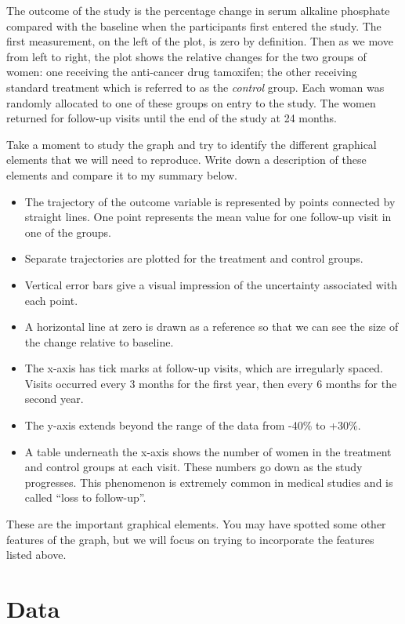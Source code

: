 \documentclass[
]{book}
\providecommand{\tightlist}{%
  \setlength{\itemsep}{0pt}\setlength{\parskip}{0pt}}
\begin{document}
The outcome of the study is the percentage change in serum alkaline phosphate compared with the baseline when the participants first entered the study. The first measurement, on the left of the plot, is zero by definition. Then as we move from left to right, the plot shows the relative changes for the two groups of women: one receiving the anti-cancer drug tamoxifen; the other receiving standard treatment which is referred to as the \emph{control} group. Each woman was randomly allocated to one of these groups on entry to the study. The women returned for follow-up visits until the end of the study at 24 months.

Take a moment to study the graph and try to identify the different graphical elements that we will need to reproduce. Write down a description of these elements and compare it to my summary below.

\begin{itemize}
\tightlist
\item
  The trajectory of the outcome variable is represented by points connected by straight lines. One point represents the mean value for one follow-up visit in one of the groups.
\item
  Separate trajectories are plotted for the treatment and control groups.
\item
  Vertical error bars give a visual impression of the uncertainty associated with each point.
\item
  A horizontal line at zero is drawn as a reference so that we can see the size of the change relative to baseline.
\item
  The x-axis has tick marks at follow-up visits, which are irregularly spaced. Visits occurred every 3 months for the first year, then every 6 months for the second year.
\item
  The y-axis extends beyond the range of the data from -40\% to +30\%.
\item
  A table underneath the x-axis shows the number of women in the treatment and control groups at each visit. These numbers go down as the study progresses. This phenomenon is extremely common in medical studies and is called ``loss to follow-up''.
\end{itemize}

These are the important graphical elements. You may have spotted some other features of the graph, but we will focus on trying to incorporate the features listed above.

\section{Data}\label{data}
\end{document}
